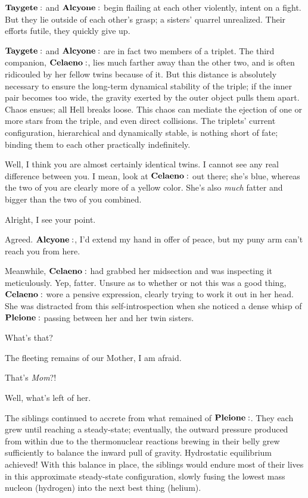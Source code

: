 $\Taygete$ and $\Alcyone$ begin flailing at each other violently, intent on a fight.  But they lie outside of each other's grasp; a sisters' quarrel unrealized.  Their efforts futile, they quickly give up.  

$\Taygete$ and $\Alcyone$ are in fact two members of a triplet.  The third companion, $\Celaeno$, lies much farther away than the other two, and is often ridicouled by her fellow twins because of it.  But this distance is absolutely necessary to ensure the long-term dynamical stability of the triple;  if the inner pair becomes too wide, the gravity exerted by the outer object pulls them apart.  Chaos ensues; all Hell breaks loose.  This chaos can mediate the ejection of one or more stars from the triple, and even direct collisions.  The triplets' current configuration, hierarchical and dynamically stable, is nothing short of fate; binding them to each other practically indefinitely.

\Maia Well, I think you are almost certainly identical twins.  I cannot see any real difference between you.  I mean, look at $\Celaeno$ out there; she's blue, whereas the two of you are clearly more of a yellow color.  She's also \textit{much} fatter and bigger than the two of you combined.  

\Celaeno Alright, I see your point.

\Taygete Agreed.  $\Alcyone$, I'd extend my hand in offer of peace, but my puny arm can't reach you from here.

Meanwhile, $\Celaeno$ had grabbed her midsection and was inspecting it meticulously.  Yep, fatter.  Unsure as to whether or not this was a good thing, $\Celaeno$ wore a pensive expression, clearly trying to work it out in her head.  She was distracted from this self-introspection when she noticed a dense whisp of $\Pleione$ passing between her and her twin sisters.  

\Celaeno What's that?

\Maia The fleeting remains of our Mother, I am afraid.

\Electra That's \textit{Mom}?!

\Maia Well, what's left of her.

The siblings continued to accrete from what remained of $\Pleione$.  They each grew until reaching a steady-state; eventually, the outward pressure produced from within due to the thermonuclear reactions brewing in their belly grew sufficiently to balance the inward pull of gravity.  Hydrostatic equilibrium achieved!  With this balance in place, the siblings would endure most of their lives in this approximate steady-state configuration, slowly fusing the lowest mass nucleon (hydrogen) into the next best thing (helium).

